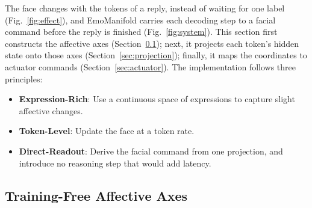 \documentclass[letterpaper, 10 pt, conference]{ieeeconf}
\begin{document}
The face changes with the tokens of a reply, instead of waiting for one label (Fig.~\ref{fig:effect}), and EmoManifold carries each decoding step to a facial command before the reply is finished (Fig.~\ref{fig:system}). This section first constructs the affective axes (Section~\ref{sec:axis_mining}); next, it projects each token's hidden state onto those axes (Section~\ref{sec:projection}); finally, it maps the coordinates to actuator commands (Section~\ref{sec:actuator}). The implementation follows three principles:
\begin{itemize}
\item \textbf{Expression-Rich}: Use a continuous space of expressions to capture slight affective changes.
\item \textbf{Token-Level}: Update the face at a token rate.
\item \textbf{Direct-Readout}: Derive the facial command from one projection, and introduce no reasoning step that would add latency.
\end{itemize}

\subsection{Training-Free Affective Axes}
\label{sec:axis_mining}
\end{document}
